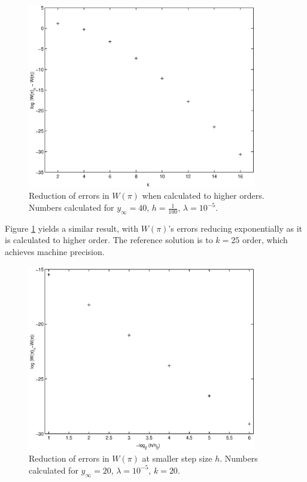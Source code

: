 \documentclass[10pt,a4paper]{report}
\begin{document}
\begin{figure}[p]
\centering
\includegraphics[width=10cm]{pics/wcpi_ord.eps}
\caption[Reduction of errors in $W(\pi)$ when calculated to higher orders]{Reduction of errors in $W(\pi)$ when calculated to higher orders. Numbers calculated for $y_\infty=40$, $h = \frac{1}{100}$, $\lambda = 10^{-5}$.}
\label{wcorder}
\end{figure}

Figure \ref{wcorder} yields a similar result, with $W(\pi)$'s errors reducing exponentially as it is calculated to higher order. The reference solution is to $k=25$ order, which achieves machine precision.

\clearpage

\begin{figure}[ht]
\centering
\includegraphics[width=10cm]{pics/wcpi_h.eps}
\caption[Reduction of errors in $W(\pi)$ with decrease of $h$]{Reduction of errors in $W(\pi)$ at smaller step size $h$. Numbers calculated for $y_\infty=20$, $\lambda = 10^{-5}$, $k=20$.}
\label{wcstep}
\end{figure}
\end{document}
